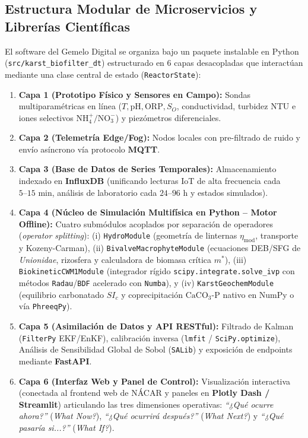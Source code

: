 \documentclass[11pt,letterpaper]{article}
\begin{document}
\subsection{Estructura Modular de Microservicios y Librerías Científicas}
El software del Gemelo Digital se organiza bajo un paquete instalable en Python (\texttt{src/karst\_biofilter\_dt}) estructurado en 6 capas desacopladas que interactúan mediante una clase central de estado (\texttt{ReactorState}):
\begin{enumerate}[leftmargin=1.5em]
    \item \textbf{Capa 1 (Prototipo Físico y Sensores en Campo):} Sondas multiparamétricas en línea ($T, \text{pH}, \text{ORP}, S_O$, conductividad, turbidez NTU e iones selectivos $\text{NH}_4^+/\text{NO}_3^-$) y piezómetros diferenciales.
    \item \textbf{Capa 2 (Telemetría Edge/Fog):} Nodos locales con pre-filtrado de ruido y envío asíncrono vía protocolo \textbf{MQTT}.
    \item \textbf{Capa 3 (Base de Datos de Series Temporales):} Almacenamiento indexado en \textbf{InfluxDB} (unificando lecturas IoT de alta frecuencia cada $5\text{--}15\text{ min}$, análisis de laboratorio cada $24\text{--}96\text{ h}$ y estados simulados).
    \item \textbf{Capa 4 (Núcleo de Simulación Multifísica en Python -- Motor Offline):} Cuatro submódulos acoplados por separación de operadores (\textit{operator splitting}): (i) \texttt{HydroModule} (geometría de linternas $\eta_{\text{mod}}$, transporte y Kozeny-Carman), (ii) \texttt{BivalveMacrophyteModule} (ecuaciones DEB/SFG de \textit{Unionidae}, rizosfera y calculadora de biomasa crítica $m^*$), (iii) \texttt{BiokineticCWM1Module} (integrador rígido \texttt{scipy.integrate.solve\_ivp} con métodos \texttt{Radau}/\texttt{BDF} acelerado con \texttt{Numba}), y (iv) \texttt{KarstGeochemModule} (equilibrio carbonatado $SI_c$ y coprecipitación $\text{CaCO}_3\text{-P}$ nativo en NumPy o vía \texttt{PhreeqPy}).
    \item \textbf{Capa 5 (Asimilación de Datos y API RESTful):} Filtrado de Kalman (\texttt{FilterPy} EKF/EnKF), calibración inversa (\texttt{lmfit} / \texttt{SciPy.optimize}), Análisis de Sensibilidad Global de Sobol (\texttt{SALib}) y exposición de endpoints mediante \textbf{FastAPI}.
    \item \textbf{Capa 6 (Interfaz Web y Panel de Control):} Visualización interactiva (conectada al frontend web de NÁCAR y paneles en \textbf{Plotly Dash / Streamlit}) articulando las tres dimensiones operativas: \textit{``¿Qué ocurre ahora?''} (\textit{What Now?}), \textit{``¿Qué ocurrirá después?''} (\textit{What Next?}) y \textit{``¿Qué pasaría si...?''} (\textit{What If?}).
\end{enumerate}
\end{document}
